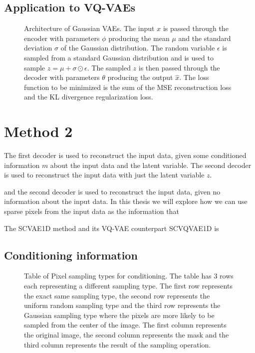 \subsection{Application to VQ-VAEs}

\begin{figure}[H]
    \centering 
    
    \caption[Architecture of SCVAE1D.]%
    { 
        Architecture of Gaussian VAEs. The input $x$ is passed through the encoder with parameters $\phi$ producing the mean $\mu$ and the standard deviation $\sigma$ of the Gaussian distribution. The random variable $\epsilon$ is sampled from a standard Gaussian distribution and is used to sample $ z = \mu + \sigma \odot \epsilon$. The sampled $z$ is then passed through the decoder with parameters $\theta$ producing the output $\hat{x}$. The loss function to be minimized is the sum of the MSE reconstruction loss and the KL divergence regularization loss. 
    }\label{SCVQVAE1DFigure}
\end{figure}

\section{Method 2}


The first decoder is used to reconstruct the input data, given some conditioned information $m$ about the input data and the latent variable. The second decoder is used to reconstruct the input data with just the latent variable $z$.

and the second decoder is used to reconstruct the input data, given no information about the input data. In this thesis we will explore how we can use sparse pixels from the input data as the information that 

The SCVAE1D method and its VQ-VAE counterpart SCVQVAE1D is 

\subsection{Conditioning information}



\begin{figure}
    \centering 
    
    \caption[Table of Pixel sampling types for conditioning.]%
    { 
        Table of Pixel sampling types for conditioning. The table has 3 rows each representing a different sampling type. The first row represents the exact same sampling type, the second row represents the uniform random sampling type and the third row represents the Gaussian sampling type where the pixels are more likely to be sampled from the center of the image. The first column represents the original image, the second column represents the mask and the third column represents the result of the sampling operation. 
    }\label{SamplingFigure}
\end{figure}





